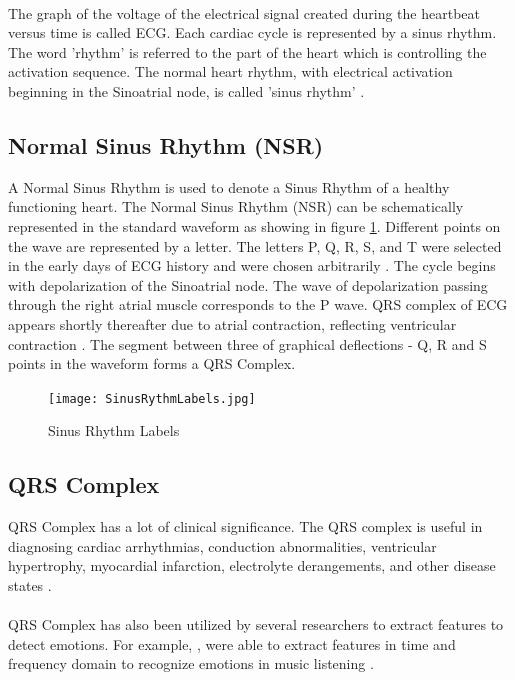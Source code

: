 \paragraph{}
The graph of the voltage of the electrical signal created during the heartbeat versus time is called ECG. Each cardiac cycle is represented by a sinus rhythm. The word 'rhythm' is referred to the part of the heart which is controlling the activation sequence. The normal heart rhythm, with electrical activation beginning in the Sinoatrial node, is called 'sinus rhythm' \cite{hampton_ecg_2013}.

\subsection{Normal Sinus Rhythm (NSR)}
A Normal Sinus Rhythm is used to denote a Sinus Rhythm of a healthy functioning heart. The Normal Sinus Rhythm (NSR) can be schematically represented in the standard waveform as showing in figure \ref{fig:sinus_rhythm_labels}. Different points on the wave are represented by a letter. The letters P, Q, R, S, and T were selected in the early days of ECG history and were chosen arbitrarily \cite{hampton_ecg_2013}. The cycle begins with depolarization of the Sinoatrial node. The wave of depolarization passing through the right atrial muscle corresponds to the P wave. QRS complex of ECG appears shortly thereafter due to atrial contraction, reflecting ventricular contraction \cite{cacioppo_cardiovascular_2016_p_183_216}. The segment between three of graphical deflections - Q, R and S points in the waveform forms a QRS Complex.

\begin{figure}
    \centering
    \texttt{[image: SinusRythmLabels.jpg]}
    \caption{Sinus Rhythm Labels \cite{cacioppo_cardiovascular_2016_p_183_216}}
    \label{fig:sinus_rhythm_labels}
\end{figure}

\subsection{QRS Complex}
QRS Complex has a lot of clinical significance. The QRS complex is useful in diagnosing cardiac arrhythmias, conduction abnormalities, ventricular hypertrophy, myocardial infarction, electrolyte derangements, and other disease states \cite{noauthor_qrs_2018}.
\paragraph{}
QRS Complex has also been utilized by several researchers to extract features to detect emotions. For example, \citeauthor{kim_emotion_2004}, were able to extract features in time and frequency domain to recognize emotions in music listening \cite{kim_emotion_2004}.

